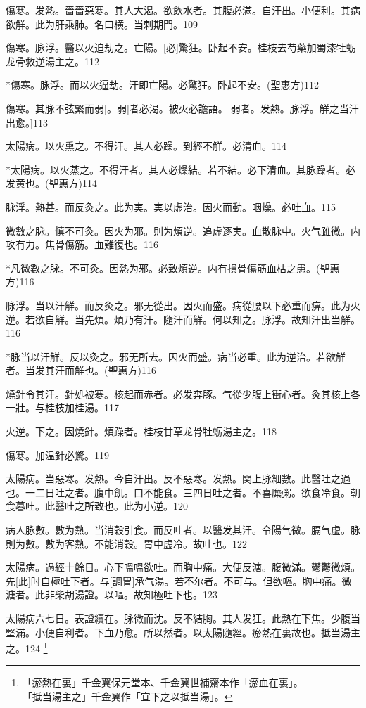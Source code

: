 \documentclass[12pt,oneside,UTF8,b5paper]{ctexbook}她她她她她她她
\begin{document}
傷寒。发熱。嗇嗇惡寒。其人大渴。欲飲水者。其腹必滿。自汗出。小便利。其病欲觧。此为肝乘肺。名曰横。当刺期門。109

傷寒。脉浮。醫以火迫劫之。亡陽。[必]驚狂。卧起不安。桂枝去芍藥加蜀漆牡蛎龙骨救逆湯主之。112

*傷寒。脉浮。而以火逼劫。汗即亡陽。必驚狂。卧起不安。(聖惠方)112

傷寒。其脉不弦緊而弱[。弱]者必渴。被火必譫語。[弱者。发熱。脉浮。觧之当汗出愈。]113

太陽病。以火熏之。不得汗。其人必躁。到經不觧。必清血。114

*太陽病。以火蒸之。不得汗者。其人必燥結。若不結。必下清血。其脉躁者。必发黄也。(聖惠方)114

脉浮。熱甚。而反灸之。此为実。実以虚治。因火而動。咽燥。必吐血。115　

微數之脉。慎不可灸。因火为邪。則为煩逆。追虚逐実。血散脉中。火气雖微。内攻有力。焦骨傷筋。血難復也。116

*凡微數之脉。不可灸。因熱为邪。必致煩逆。内有損骨傷筋血枯之患。(聖惠方)116

脉浮。当以汗觧。而反灸之。邪无從出。因火而盛。病從腰以下必重而痹。此为火逆。若欲自觧。当先煩。煩乃有汗。隨汗而觧。何以知之。脉浮。故知汗出当觧。116

*脉当以汗觧。反以灸之。邪无所去。因火而盛。病当必重。此为逆治。若欲觧者。当发其汗而觧也。(聖惠方)116

燒針令其汗。針処被寒。核起而赤者。必发奔豚。气從少腹上衝心者。灸其核上各一壯。与桂枝加桂湯。117

火逆。下之。因燒針。煩躁者。桂枝甘草龙骨牡蛎湯主之。118

傷寒。加温針必驚。119

太陽病。当惡寒。发熱。今自汗出。反不惡寒。发熱。関上脉細數。此醫吐之過也。一二日吐之者。腹中飢。口不能食。三四日吐之者。不喜糜粥。欲食冷食。朝食暮吐。此醫吐之所致也。此为小逆。120

病人脉數。數为熱。当消穀引食。而反吐者。以醫发其汗。令陽气微。膈气虚。脉則为數。數为客熱。不能消穀。胃中虚冷。故吐也。122

太陽病。過經十餘日。心下嗢嗢欲吐。而胸中痛。大便反溏。腹微滿。鬱鬱微煩。先[此]时自極吐下者。与[調胃]承气湯。若不尔者。不可与。但欲嘔。胸中痛。微溏者。此非柴胡湯證。以嘔。故知極吐下也。123

太陽病六七日。表證續在。脉微而沈。反不結胸。其人发狂。此熱在下焦。少腹当堅滿。小便自利者。下血乃愈。所以然者。以太陽隨經。瘀熱在裏故也。抵当湯主之。124
	\footnote{「瘀熱在裏」千金翼保元堂本、千金翼世補齋本作「瘀血在裏」。\\「抵当湯主之」千金翼作「宜下之以抵当湯」。}
\end{document}
